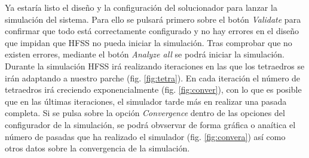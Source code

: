 \par Ya estaría listo el diseño y la configuración del solucionador para lanzar la simulación del sistema. Para ello se pulsará primero sobre el botón \textit{Validate} para confirmar que todo está correctamente configurado y no hay errores en el diseño que impidan que HFSS no pueda iniciar la simulación. Tras comprobar que no existen errores, mediante el botón \textit{Analyze all} se podrá iniciar la simulación. Durante la simulación HFSS irá realizando iteraciones en las que los tetraedros se irán adaptando a nuestro parche (fig. \ref{fig:tetra}). En cada iteración el número de tetraedros irá creciendo exponencialmente (fig. \ref{fig:conver}), con lo que es posible que en las últimas iteraciones, el simulador tarde más en realizar una pasada completa. Si se pulsa sobre la opción \textit{Convergence} dentro de las opciones del configurador de la simulación, se podrá obvservar de forma gráfica o anaítica el número de pasadas que ha realizado el simulador (fig. \ref{fig:convera}) así como otros datos sobre la convergencia de la simulación.
\\

